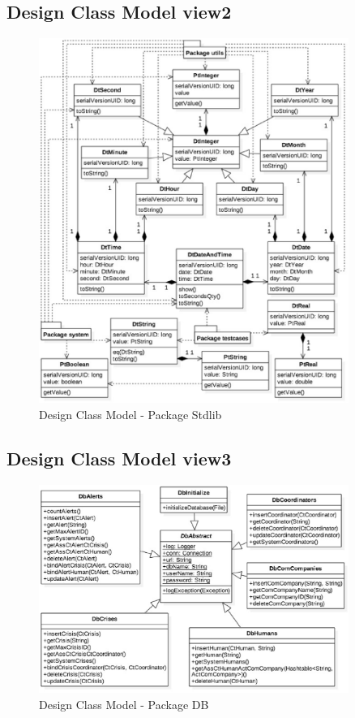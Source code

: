 \subsection{Design Class Model view2}
\begin{figure}[h!]
	\centering
	\includegraphics[width=0.9\textwidth]{./images/dcm_stdlib.eps}
	\caption{Design Class Model - Package Stdlib}
\end{figure}



\subsection{Design Class Model view3}
\begin{figure}[h!]
	\centering
	\includegraphics[width=0.9\textwidth]{./images/dcm_db.eps}
	\caption{Design Class Model - Package DB}
\end{figure}

